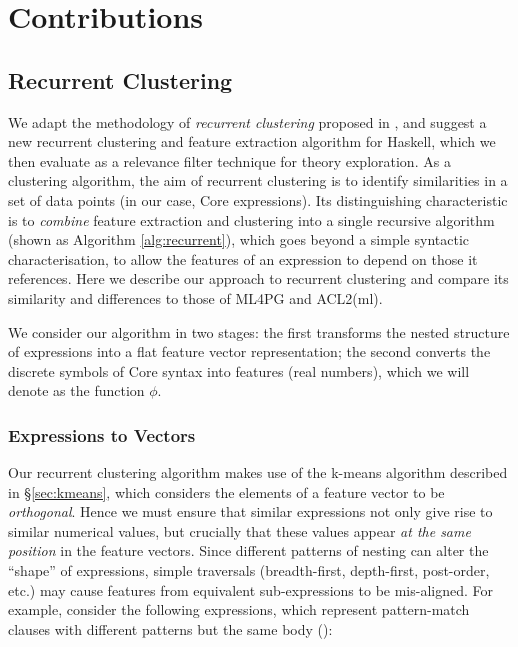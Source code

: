 \section{Contributions}
\label{sec:contributions}

\subsection{Recurrent Clustering}
\label{sec:recurrentclustering}

We adapt the methodology of \emph{recurrent clustering} proposed in \citep{DBLP:journals/corr/HerasK14, heras2013proof}, and suggest a new recurrent clustering and feature extraction algorithm for Haskell, which we then evaluate as a relevance filter technique for theory exploration. As a clustering algorithm, the aim of recurrent clustering is to identify similarities in a set of data points (in our case, Core expressions). Its distinguishing characteristic is to \emph{combine} feature extraction and clustering into a single recursive algorithm (shown as Algorithm \ref{alg:recurrent}), which goes beyond a simple syntactic characterisation, to allow the features of an expression to depend on those it references. Here we describe our approach to recurrent clustering and compare its similarity and differences to those of ML4PG and ACL2(ml).

We consider our algorithm in two stages: the first transforms the nested structure of expressions into a flat feature vector representation; the second converts the discrete symbols of Core syntax into features (real numbers), which we will denote as the function $\phi$.

\subsubsection{Expressions to Vectors}
\label{sec:expressionstovectors}

Our recurrent clustering algorithm makes use of the k-means algorithm described in \S \ref{sec:kmeans}, which considers the elements of a feature vector to be \emph{orthogonal}. Hence we must ensure that similar expressions not only give rise to similar numerical values, but crucially that these values appear \emph{at the same position} in the feature vectors. Since different patterns of nesting can alter the ``shape'' of expressions, simple traversals (breadth-first, depth-first, post-order, etc.) may cause features from equivalent sub-expressions to be mis-aligned. For example, consider the following expressions, which represent pattern-match clauses with different patterns but the same body ():

